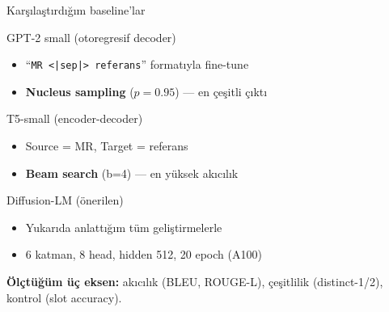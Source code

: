 \documentclass[10pt,aspectratio=169]{beamer}
\begin{document}
\begin{frame}{Karşılaştırdığım baseline'lar}
  \begin{block}{GPT-2 small (otoregresif decoder)}
    \begin{itemize}
      \item ``\texttt{MR <|sep|> referans}'' formatıyla fine-tune
      \item \textbf{Nucleus sampling} ($p=0.95$) --- en çeşitli çıktı
    \end{itemize}
  \end{block}

  \begin{block}{T5-small (encoder-decoder)}
    \begin{itemize}
      \item Source = MR, Target = referans
      \item \textbf{Beam search} (b=4) --- en yüksek akıcılık
    \end{itemize}
  \end{block}

  \begin{block}{Diffusion-LM (önerilen)}
    \begin{itemize}
      \item Yukarıda anlattığım tüm geliştirmelerle
      \item 6 katman, 8 head, hidden 512, 20 epoch (A100)
    \end{itemize}
  \end{block}

  \textbf{Ölçtüğüm üç eksen:} akıcılık (BLEU, ROUGE-L), çeşitlilik
  (distinct-1/2), kontrol (slot accuracy).
\end{frame}
\end{document}
